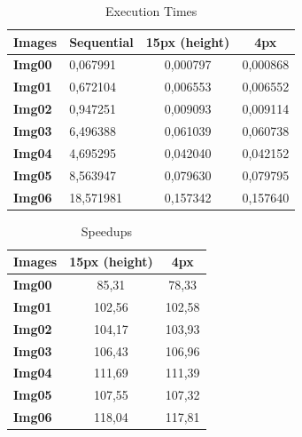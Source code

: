 \documentclass[a4paper]{article}
\begin{document}
\begin{table}[!ht]
\centering
\begin{tabular}{|l|l|c|c|}
\hline
\textbf{Images} & \textbf{Sequential} & \textbf{15px (height)} & \textbf{4px} \\ \hline
\textbf{Img00}  & 0,067991            & 0,000797               & 0,000868     \\ \hline
\textbf{Img01}  & 0,672104            & 0,006553               & 0,006552     \\ \hline
\textbf{Img02}  & 0,947251            & 0,009093               & 0,009114     \\ \hline
\textbf{Img03}  & 6,496388            & 0,061039               & 0,060738     \\ \hline
\textbf{Img04}  & 4,695295            & 0,042040               & 0,042152     \\ \hline
\textbf{Img05}  & 8,563947            & 0,079630               & 0,079795     \\ \hline
\textbf{Img06}  & 18,571981           & 0,157342               & 0,157640     \\ \hline
\end{tabular}
\caption{Execution Times}
\label{tab:smooth_exe}
\end{table}
\FloatBarrier

\begin{table}[!ht]
\centering
\begin{tabular}{|l|c|c|}
\hline
\textbf{Images} & \textbf{15px (height)} & \textbf{4px} \\ \hline
\textbf{Img00}  & 85,31                  & 78,33        \\ \hline
\textbf{Img01}  & 102,56                 & 102,58       \\ \hline
\textbf{Img02}  & 104,17                 & 103,93       \\ \hline
\textbf{Img03}  & 106,43                 & 106,96       \\ \hline
\textbf{Img04}  & 111,69                 & 111,39       \\ \hline
\textbf{Img05}  & 107,55                 & 107,32       \\ \hline
\textbf{Img06}  & 118,04                 & 117,81       \\ \hline
\end{tabular}
\caption{Speedups}
\label{tab:smooth_sp}
\end{table}
\FloatBarrier
\end{document}
